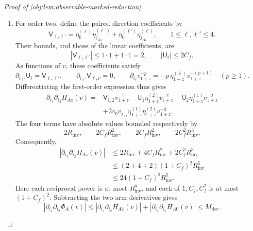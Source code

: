 \begin{proof}[Proof of \cref{obj:lem:observable-marked-reduction}]
\begin{enumerate}
\item For order two, define the paired direction coefficients by
\[
\mathsf V_{\ell,\ell'}
=\eta^{(\ell)}_0\eta^{(\ell')}_{j_{Az}}
 +\eta^{(\ell')}_0\eta^{(\ell)}_{j_{Az}},
\qquad 1\le\ell,\ell'\le4.
\]
Their bounds, and those of the linear coefficients, are
\[
|\mathsf V_{\ell,\ell'}|
\le1\cdot1+1\cdot1=2,
\qquad
|\mathsf U_\ell|\le2C_f.
\]
As functions of \(v\), these coefficients satisfy
\[
\partial_{i_{\ell'}}\mathsf U_\ell
=\mathsf V_{\ell,\ell'},
\qquad
\partial_{i_{\ell'}}\mathsf V_{\ell,\nu}=0,
\qquad
\partial_{i_\ell}v_{1+z}^{-p}
=-p\,\eta^{(\ell)}_{1+z}v_{1+z}^{-(p+1)}
\quad(p\ge1).
\]
Differentiating the first-order expression thus gives
\[
\begin{aligned}
\partial_{i_1}\partial_{i_2}H_{Az}(v)
={}&\mathsf V_{1,2}v_{1+z}^{-1}
-\mathsf U_1\eta^{(2)}_{1+z}v_{1+z}^{-2}
-\mathsf U_2\eta^{(1)}_{1+z}v_{1+z}^{-2}\\
&+2v_0v_{j_{Az}}\eta^{(1)}_{1+z}
                      \eta^{(2)}_{1+z}v_{1+z}^{-3}.
\end{aligned}
\]
The four terms have absolute values bounded respectively by
\[
2R_{\mathrm{inv}},\qquad
2C_fR_{\mathrm{inv}}^2,\qquad
2C_fR_{\mathrm{inv}}^2,\qquad
2C_f^2R_{\mathrm{inv}}^3.
\]
Consequently,
\[
\begin{aligned}
|\partial_{i_1}\partial_{i_2}H_{Az}(v)|
&\le2R_{\mathrm{inv}}
    +4C_fR_{\mathrm{inv}}^2
    +2C_f^2R_{\mathrm{inv}}^3\\
&\le(2+4+2)(1+C_f)^2R_{\mathrm{inv}}^5\\
&\le24(1+C_f)^2R_{\mathrm{inv}}^5.
\end{aligned}
\]
Here each reciprocal power is at most \(R_{\mathrm{inv}}^5\), and each of
\(1,C_f,C_f^2\) is at most \((1+C_f)^2\). Subtracting the two arm derivatives gives
\[
|\partial_{i_1}\partial_{i_2}\Phi_A(v)|
\le|\partial_{i_1}\partial_{i_2}H_{A1}(v)|
  +|\partial_{i_1}\partial_{i_2}H_{A0}(v)|
\le M_{\mathrm{der}}.
\]


\end{enumerate}
\end{proof}
